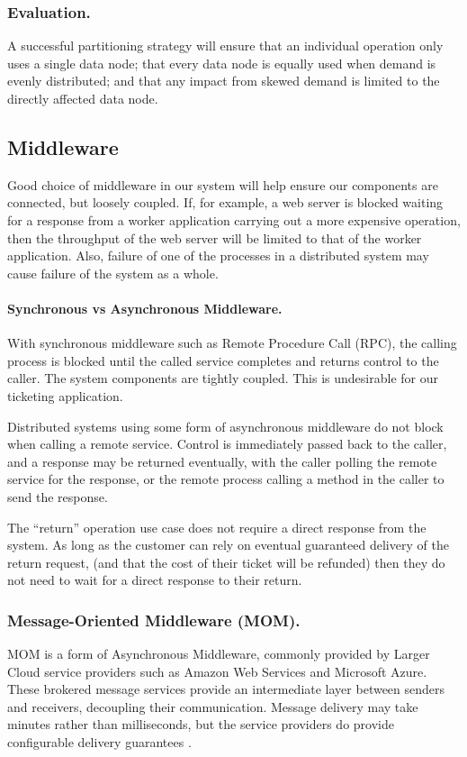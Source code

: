 \subsubsection{Evaluation.}

A successful partitioning strategy will ensure that an individual operation only uses a single data node; that every data node is equally used when demand is evenly distributed; and that any impact from skewed demand is limited to the directly affected data node.

\subsection{Middleware}

Good choice of middleware in our system will help ensure our components are connected, but loosely coupled.  If, for example, a web server is blocked waiting for a response from a worker application carrying out a more expensive operation, then the throughput of the web server will be limited to that of the worker application.  Also, failure of one of the processes in a distributed system may cause failure of the system as a whole.

\paragraph{Synchronous vs Asynchronous Middleware.}
With synchronous middleware such as Remote Procedure Call (RPC), the calling process is blocked until the called service completes and returns control to the caller.  The system components are tightly coupled.  This is undesirable for our ticketing application.

Distributed systems using some form of asynchronous middleware do not block when calling a remote service.  Control is immediately passed back to the caller, and a response may be returned eventually, with the caller polling the remote service for the response, or the remote process calling a method in the caller to send the response.

The ``return'' operation use case does not require a direct response from the system.  As long as the customer can rely on eventual guaranteed delivery of the return request, (and that the cost of their ticket will be refunded) then they do not need to wait for a direct response to their return.

\subsubsection{Message-Oriented Middleware (MOM).}  MOM is a form of Asynchronous Middleware, commonly provided by Larger Cloud service providers such as Amazon Web Services and Microsoft Azure.  These brokered message services provide an intermediate layer between senders and receivers, decoupling their communication.  Message delivery may take minutes rather than milliseconds, but the service providers do provide configurable delivery guarantees \cite{curry2004message}.


